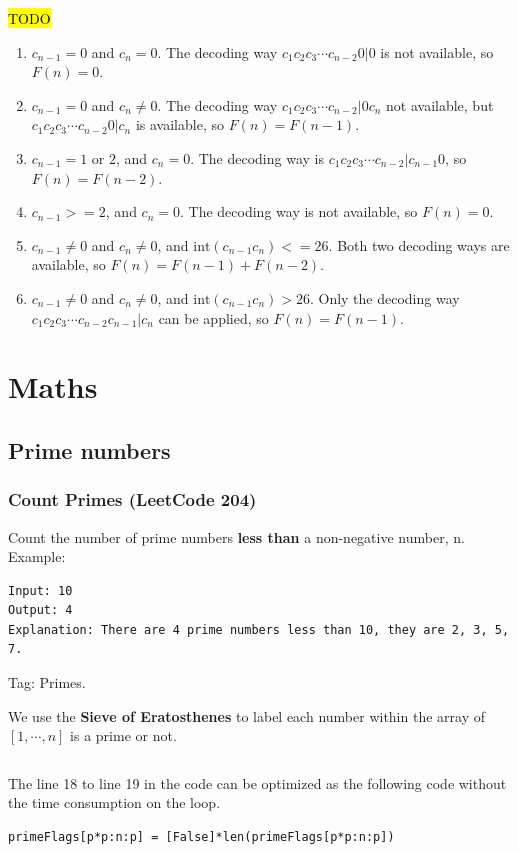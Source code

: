 \documentclass[11pt]{article}
\DeclareRobustCommand{\updated}[1]{{\sethlcolor{lightgray}\hl{#1}}}
\begin{document}
\updated{TODO}
\begin{enumerate} 
	\item $c_{n-1}=0$ and $c_{n}=0$. The decoding way $c_1 c_2 c_3 \cdots c_{n-2}  0 | 0$ is not available, so $F(n)=0$.
	\item $c_{n-1}=0$ and $c_{n}\neq 0$. The decoding way $c_1 c_2 c_3 \cdots c_{n-2} | 0 c_{n}$ not available, but $c_1 c_2 c_3 \cdots c_{n-2}  0 | c_{n}$ is available, so $F(n)=F(n-1)$. 
	\item $c_{n-1}=1 \text{ or } 2$, and $c_{n}=0$. The decoding way is $c_1 c_2 c_3 \cdots c_{n-2}  | c_{n-1}  0$, so $F(n)=F(n-2)$.
	\item $c_{n-1}>=2$, and $c_{n}=0$. The decoding way is not available, so $F(n)=0$.
	\item $c_{n-1} \neq 0$ and $c_{n} \neq 0$, and $\text{int}(c_{n-1}c_{n})<=26$. Both two decoding ways are available, so $F(n)=F(n-1)+F(n-2)$.
	\item $c_{n-1} \neq 0$ and $c_{n} \neq 0$, and $\text{int}(c_{n-1}c_{n})>26$. Only the decoding way $c_1 c_2 c_3 \cdots c_{n-2} c_{n-1} | c_{n}$ can be applied, so $F(n)=F(n-1)$.
\end{enumerate}


\section{Maths}
\subsection{Prime numbers}
\subsubsection{Count Primes (LeetCode 204)}
Count the number of prime numbers \textbf{less than} a non-negative number, n.
Example:
\begin{verbatim}
Input: 10
Output: 4
Explanation: There are 4 prime numbers less than 10, they are 2, 3, 5, 7.
\end{verbatim}

Tag: Primes.

We use the \textbf{Sieve of Eratosthenes} to label each number within the array of $[1, \cdots, n]$ is a prime or not.
\inputminted[breaklines=true,frame=leftline, linenos=true]{python}{src/countPrimes.py}

The line 18 to line 19 in the code can be optimized as the following code without the time consumption on the loop. 
\begin{verbatim}
primeFlags[p*p:n:p] = [False]*len(primeFlags[p*p:n:p])	
\end{verbatim}
\end{document}
